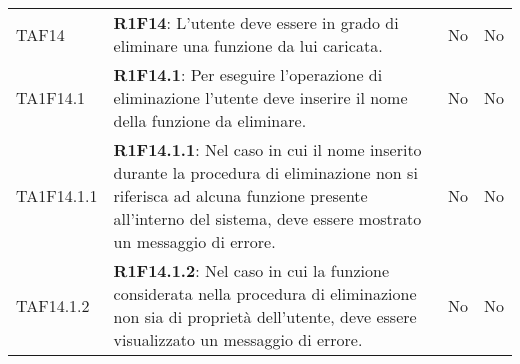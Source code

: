 \begin{longtable}{ 
		>{\centering}p{} 
		>{}p{} 
		>{\centering}p{}
		>{\centering}p{} }
	TAF14 		& \textbf{R1F14}: L'utente deve essere in grado di eliminare una funzione da lui caricata. 																								& No & No \tabularnewline
	TA1F14.1 	& \textbf{R1F14.1}: Per eseguire l'operazione di eliminazione l'utente deve inserire il nome della funzione da eliminare. 																	& No & No \tabularnewline
	TA1F14.1.1 	& \textbf{R1F14.1.1}: Nel caso in cui il nome inserito durante la procedura di eliminazione non si riferisca ad alcuna funzione presente all'interno del sistema, deve essere mostrato un messaggio di errore.	& No & No \tabularnewline
	TAF14.1.2 	& \textbf{R1F14.1.2}: Nel caso in cui la funzione considerata nella procedura di eliminazione non sia di proprietà dell'utente, deve essere visualizzato un messaggio di errore.				& No & No \tabularnewline

\end{longtable}